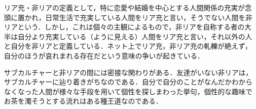 \documentclass[uplatex,twocolumn,dvipdfmx]{jsarticle}
\begin{document}
リア充・非リアの定義として，特に恋愛や結婚を中心とする人間関係の充実が念頭に置かれ，日常生活で充実している人間をリア充と言い，そうでない人間を非リアという．しかし，これは個々の主観によるもので，非リアを自称する者の大半は自分より充実している（ように見える）人間をリア充と言い，それ以外の人と自分を非リアと定義している．ネット上でリア充，非リア充の軋轢が絶えず，自分のほうが哀れまれる存在だという意味の争いが起きている．

サブカルチャーと非リアの間には密接な関わりがある．友達がいない非リアは，サブカルチャーに辿り着きがちなのである．自分で自分のことがなんだかわからなくなった人間が様々な手段を用いて個性を探しまわった挙句，個性的な趣味でお茶を濁そうとする流れはある種王道なのである．\nocite{bib001}



\end{document}
